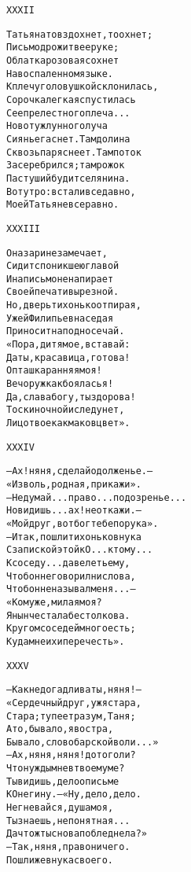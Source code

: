 \begin{minipage}[t]{\dimexpr 0.5\textwidth -\tabcolsep-.5pt}
\begin{alltt}\normalfont\centering
XXXII

Татьяна то вздохнет, то охнет;
Письмо дрожит в ее руке;
Облатка розовая сохнет
На воспаленном языке.
К плечу головушкой склонилась,
Сорочка легкая спустилась
С ее прелестного плеча...
Но вот уж лунного луча
Сиянье гаснет. Там долина
Сквозь пар яснеет. Там поток
Засеребрился; там рожок
Пастуший будит селянина.
Вот утро: встали все давно,
Моей Татьяне все равно.
\end{alltt}
\end{minipage}

\begin{minipage}[t]{\dimexpr 0.5\textwidth -\tabcolsep-.5pt}
\begin{alltt}\normalfont\centering
XXXIII

Она зари не замечает,
Сидит с поникшею главой
И на письмо не напирает
Своей печати вырезной.
Но, дверь тихонько отпирая,
Уж ей Филипьевна седая
Приносит на подносе чай.
«Пора, дитя мое, вставай:
Да ты, красавица, готова!
О пташка ранняя моя!
Вечор уж как боялась я!
Да, слава богу, ты здорова!
Тоски ночной и следу нет,
Лицо твое как маков цвет».
\end{alltt}
\end{minipage}
\clearpage

\begin{minipage}[t]{\dimexpr 0.5\textwidth -\tabcolsep-.5pt}
\begin{alltt}\normalfont\centering
XXXIV

— Ах! няня, сделай одолженье. —
«Изволь, родная, прикажи».
— Не думай... право... подозренье...
Но видишь... ах! не откажи. —
«Мой друг, вот бог тебе порука».
— Итак, пошли тихонько внука
С запиской этой к О... к тому...
К соседу... да велеть ему,
Чтоб он не говорил ни слова,
Чтоб он не называл меня... —
«Кому же, милая моя?
Я нынче стала бестолкова.
Кругом соседей много есть;
Куда мне их и перечесть».
\end{alltt}
\end{minipage}

\begin{minipage}[t]{\dimexpr 0.5\textwidth -\tabcolsep-.5pt}
\begin{alltt}\normalfont\centering
XXXV

— Как недогадлива ты, няня! —
«Сердечный друг, уж я стара,
Стара; тупеет разум, Таня;
А то, бывало, я востра,
Бывало, слово барской воли...»
— Ах, няня, няня! до того ли?
Что нужды мне в твоем уме?
Ты видишь, дело о письме
К Онегину. — «Ну, дело, дело.
Не гневайся, душа моя,
Ты знаешь, непонятна я...
Да что ж ты снова побледнела?»
— Так, няня, право ничего.
Пошли же внука своего.
\end{alltt}
\end{minipage}
\clearpage


